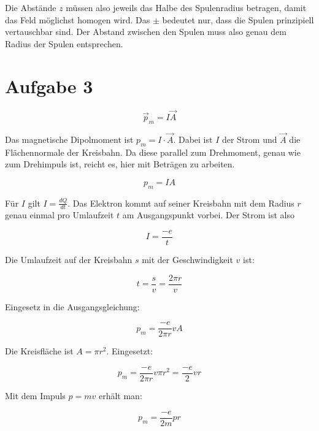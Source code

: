 \documentclass[a4paper,german,12pt,smallheadings]{scrartcl}
\begin{document}
Die Abstände $z$ müssen also jeweils das Halbe des Spulenradius betragen,
damit das Feld möglichst homogen wird. Das $\pm$ bedeutet nur, dass die Spulen
prinzipiell vertauschbar sind. Der Abstand zwischen den Spulen muss also genau
dem Radius der Spulen entsprechen.

\section*{Aufgabe 3}

\begin{equation}
  \vec{p}_m = I \vec{A}
\end{equation}

Das magnetische Dipolmoment ist $p_m = I \cdot \vec{A}$. Dabei ist $I$ der
Strom und $\vec{A}$ die Flächennormale der Kreisbahn. Da diese parallel zum
Drehmoment, genau wie zum Drehimpuls ist, reicht es, hier mit Beträgen zu
arbeiten.

\begin{equation}
  p_m = I A
\end{equation}

Für $I$ gilt $I = \frac{dQ}{dt}$. Das Elektron kommt auf seiner Kreisbahn mit
dem Radius $r$ genau einmal pro Umlaufzeit $t$ am Ausgangspunkt vorbei. Der
Strom ist also

\begin{equation}
  I = \frac{-e}{t}
\end{equation}

Die Umlaufzeit auf der Kreisbahn $s$ mit der Geschwindigkeit $v$ ist:

\begin{equation}
  t = \frac{s}{v} = \frac{2 \pi r}{v}
\end{equation}

Eingesetz in die Ausgangsgleichung:

\begin{equation}
  p_m = \frac{-e}{2 \pi r} v A
\end{equation}

Die Kreisfläche ist $A = \pi r^2$. Eingesetzt:

\begin{equation}
  p_m = \frac{-e}{2 \pi r} v \pi r^2 = \frac{-e}{2} v r
\end{equation}

Mit dem Impuls $p = mv$ erhält man:

\begin{equation}
  p_m = \frac{-e}{2m} p r
\end{equation}
\end{document}

